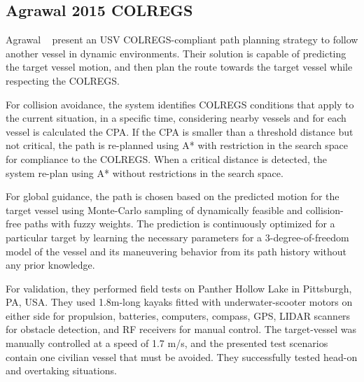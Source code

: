     
    \subsection{Agrawal 2015 COLREGS}
    Agrawal \etal~\cite{Agrawal2015COLREGS} present an \ac{USV} \ac{COLREGS}-compliant path planning strategy to follow another vessel in dynamic environments. Their solution is capable of predicting the target vessel motion, and then plan the route towards the target vessel while respecting the \ac{COLREGS}. 
    
    For collision avoidance, the system identifies \ac{COLREGS} conditions that apply to the current situation, in a specific time, considering nearby vessels and for each vessel is calculated the \ac{CPA}. If the \ac{CPA} is smaller than a threshold distance but not critical, the path is re-planned using A* with restriction in the search space for compliance to the \ac{COLREGS}.  When a critical distance is detected, the system re-plan using A* without restrictions in the search space. 
    
    For global guidance, the path is chosen based on the predicted motion for the target vessel using Monte-Carlo sampling of dynamically feasible and collision-free paths with fuzzy weights. The prediction is continuously optimized for a particular target by learning the necessary parameters for a 3-degree-of-freedom model of the vessel and its maneuvering behavior from its path history without any prior knowledge.
    
    For validation, they performed field tests on Panther Hollow Lake in Pittsburgh, PA, USA. They used 1.8m-long kayaks fitted with underwater-scooter motors on either side for propulsion, batteries, computers, compass, GPS, LIDAR scanners for obstacle detection, and RF receivers for manual control. The target-vessel was manually controlled at a speed of 1.7 m/s, and the presented test scenarios contain one civilian vessel that must be avoided. They successfully tested head-on and overtaking situations.
    
